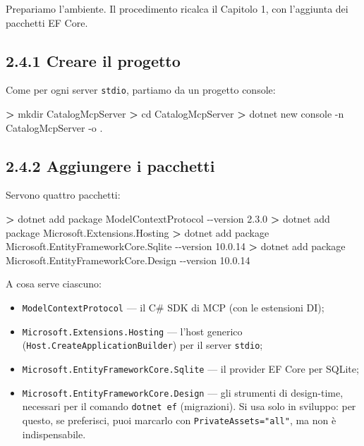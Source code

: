 \documentclass[
  italian,
  10pt,
]{book}
\newenvironment{Shaded}{\begin{snugshade}}{\end{snugshade}}
\newcommand{\AttributeTok}[1]{\textcolor[rgb]{0.13,0.29,0.53}{#1}}
\newcommand{\ExtensionTok}[1]{#1}
\newcommand{\NormalTok}[1]{#1}
\newcommand{\OperatorTok}[1]{\textcolor[rgb]{0.81,0.36,0.00}{\textbf{#1}}}
\providecommand{\tightlist}{%
  \setlength{\itemsep}{0pt}\setlength{\parskip}{0pt}}
\begin{document}
Prepariamo l'ambiente. Il procedimento ricalca il Capitolo 1, con
l'aggiunta dei pacchetti EF Core.

\subsection{2.4.1 Creare il progetto}\label{creare-il-progetto}

Come per ogni server \texttt{stdio}, partiamo da un progetto console:

\begin{Shaded}
\begin{Highlighting}[]
\OperatorTok{\textgreater{}}\NormalTok{ mkdir }\ExtensionTok{CatalogMcpServer}
\OperatorTok{\textgreater{}}\NormalTok{ cd }\ExtensionTok{CatalogMcpServer}
\OperatorTok{\textgreater{}}\NormalTok{ dotnet }\ExtensionTok{new}\NormalTok{ console }\AttributeTok{{-}n}\NormalTok{ CatalogMcpServer }\AttributeTok{{-}o}\NormalTok{ .}
\end{Highlighting}
\end{Shaded}

\subsection{2.4.2 Aggiungere i pacchetti}\label{aggiungere-i-pacchetti}

Servono quattro pacchetti:

\begin{Shaded}
\begin{Highlighting}[]
\OperatorTok{\textgreater{}}\NormalTok{ dotnet }\ExtensionTok{add}\NormalTok{ package ModelContextProtocol }\AttributeTok{{-}{-}version}\NormalTok{ 2.3.0}
\OperatorTok{\textgreater{}}\NormalTok{ dotnet }\ExtensionTok{add}\NormalTok{ package Microsoft.Extensions.Hosting}
\OperatorTok{\textgreater{}}\NormalTok{ dotnet }\ExtensionTok{add}\NormalTok{ package Microsoft.EntityFrameworkCore.Sqlite }\AttributeTok{{-}{-}version}\NormalTok{ 10.0.14}
\OperatorTok{\textgreater{}}\NormalTok{ dotnet }\ExtensionTok{add}\NormalTok{ package Microsoft.EntityFrameworkCore.Design }\AttributeTok{{-}{-}version}\NormalTok{ 10.0.14}
\end{Highlighting}
\end{Shaded}

A cosa serve ciascuno:

\begin{itemize}
\tightlist
\item
  \texttt{ModelContextProtocol} --- il C\# SDK di MCP (con le estensioni
  DI);
\item
  \texttt{Microsoft.Extensions.Hosting} --- l'host generico
  (\texttt{Host.CreateApplicationBuilder}) per il server \texttt{stdio};
\item
  \texttt{Microsoft.EntityFrameworkCore.Sqlite} --- il provider EF Core
  per SQLite;
\item
  \texttt{Microsoft.EntityFrameworkCore.Design} --- gli strumenti di
  design-time, necessari per il comando \texttt{dotnet\ ef}
  (migrazioni). Si usa solo in sviluppo: per questo, se preferisci, puoi
  marcarlo con \texttt{PrivateAssets="all"}, ma non è indispensabile.
\end{itemize}
\end{document}
